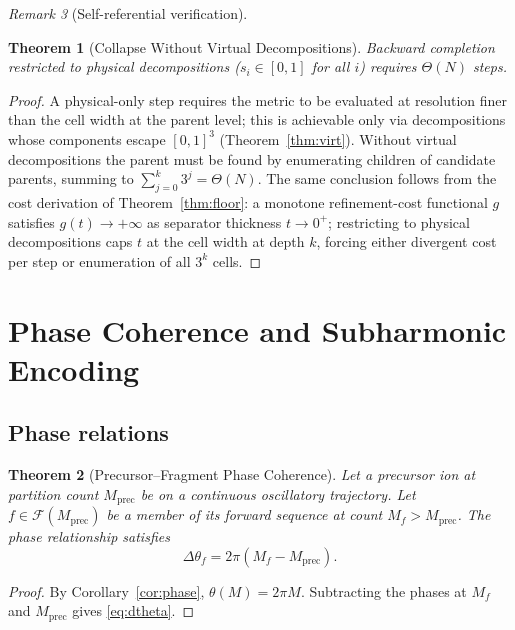 \documentclass[twocolumn,10pt,a4paper]{article}
\theoremstyle{thmstyle}
\newtheorem{theorem}{Theorem}[section]
\theoremstyle{definition}
\theoremstyle{remark}
\newtheorem{remark}[theorem]{Remark}
\newcommand{\calF}{\mathcal{F}}
\begin{document}
\begin{remark}[Self-referential verification]
\begin{theorem}[Collapse Without Virtual Decompositions]
\label{thm:collapse}
Backward completion restricted to physical decompositions
($s_{i}\in[0,1]$ for all $i$) requires $\Theta(N)$ steps.
\end{theorem}

\begin{proof}
A physical-only step requires the metric to be evaluated at resolution
finer than the cell width at the parent level; this is achievable only
via decompositions whose components escape $[0,1]^{3}$
(Theorem~\ref{thm:virt}). Without virtual decompositions the parent
must be found by enumerating children of candidate parents, summing
to $\sum_{j=0}^{k}3^{j}=\Theta(N)$. The same conclusion follows from
the cost derivation of Theorem~\ref{thm:floor}: a monotone
refinement-cost functional $g$ satisfies $g(t)\to+\infty$ as
separator thickness $t\to 0^{+}$; restricting to physical
decompositions caps $t$ at the cell width at depth $k$, forcing
either divergent cost per step or enumeration of all $3^{k}$ cells.
\end{proof}

\section{Phase Coherence and Subharmonic Encoding}
\label{sec:phase}

\subsection{Phase relations}

\begin{theorem}[Precursor--Fragment Phase Coherence]
\label{thm:coh}
Let a precursor ion at partition count $M_{\mathrm{prec}}$ be on a
continuous oscillatory trajectory. Let $f\in\calF(M_{\mathrm{prec}})$
be a member of its forward sequence at count
$M_{f}>M_{\mathrm{prec}}$. The phase relationship satisfies
\begin{equation}
\boxed{\;\Delta\theta_{f}=2\pi(M_{f}-M_{\mathrm{prec}}).\;}
\label{eq:dtheta}
\end{equation}
\end{theorem}

\begin{proof}
By Corollary~\ref{cor:phase}, $\theta(M)=2\pi M$. Subtracting the
phases at $M_{f}$ and $M_{\mathrm{prec}}$ gives \eqref{eq:dtheta}.
\end{proof}


\end{remark}
\end{document}
